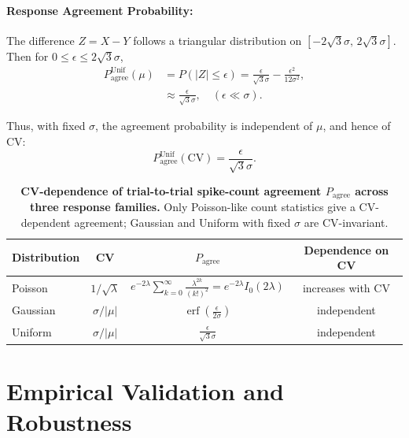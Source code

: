 \documentclass[11pt]{article}
\theoremstyle{remark}
\theoremstyle{definition}
\begin{document}
\paragraph{Response Agreement Probability:}
The difference \(Z = X-Y\) follows a triangular distribution on \([-2\sqrt{3}\sigma,\,2\sqrt{3}\sigma]\).
Then for \(0 \leq \epsilon \leq 2\sqrt{3}\sigma\),
\begin{align}
P_{\mathrm{agree}}^{\text{Unif}}(\mu)
&= P(|Z|\leq \epsilon)
= \frac{\epsilon}{\sqrt{3}\sigma} - \frac{\epsilon^2}{12\sigma^2}, \\
&\approx \frac{\epsilon}{\sqrt{3}\sigma}, \quad (\epsilon \ll \sigma).
\end{align}

Thus, with fixed \(\sigma\), the agreement probability is independent of \(\mu\), and hence of CV:
\begin{equation}
P_{\mathrm{agree}}^{\text{Unif}}(\mathrm{CV}) = \frac{\epsilon}{\sqrt{3}\sigma}.
\end{equation}


\begin{table}[h]
\centering
\caption{\textbf{CV-dependence of trial-to-trial spike-count agreement $P_{\mathrm{agree}}$ across three response families.}  Only Poisson-like count statistics give a CV-dependent agreement; Gaussian and Uniform with fixed $\sigma$ are CV-invariant.}
\label{tab:agree-families}
\renewcommand{\arraystretch}{1.6}
\begin{tabular}{@{}lccc@{}}
\toprule
\textbf{Distribution} & \textbf{CV} & \textbf{$P_{\mathrm{agree}}$} & \textbf{Dependence on CV} \\ \midrule
Poisson & \(1/\sqrt{\lambda}\) & \(e^{-2\lambda}\sum_{k=0}^{\infty}\frac{\lambda^{2k}}{(k!)^2} = e^{-2\lambda}I_0(2\lambda)\) & increases with CV \\
Gaussian & \(\sigma/|\mu|\) & \(\operatorname{erf}\!\left(\tfrac{\epsilon}{2\sigma}\right)\) & independent \\
Uniform  & \(\sigma/|\mu|\) & \(\tfrac{\epsilon}{\sqrt{3}\sigma}\) & independent \\
\bottomrule
\end{tabular}
\end{table}

\newpage

\section{Empirical Validation and Robustness}
\label{sec:empirical}
\end{document}
